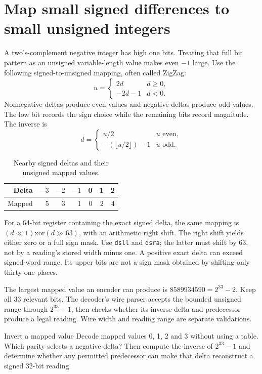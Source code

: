 \section{Map small signed differences to small unsigned integers}
A two's-complement negative integer has high one bits. Treating that full bit pattern
as an unsigned variable-length value makes even \(-1\) large. Use the following
signed-to-unsigned mapping, often called ZigZag:
\[
  u=\begin{cases}2d&d\geq0,\\-2d-1&d<0.\end{cases}
\]
Nonnegative deltas produce even values and negative deltas produce odd values.
The low bit records the sign choice while the remaining bits record magnitude.
The inverse is
\[
  d=\begin{cases}u/2&u\text{ even},\\-(\lfloor u/2\rfloor)-1&u\text{ odd}.\end{cases}
\]

\begin{table}[htbp]
  \centering
  \caption{Nearby signed deltas and their unsigned mapped values.}
  \begin{tabular}{rrrrrrr}
    \toprule
    Delta  & \(-3\) & \(-2\) & \(-1\) & 0 & 1 & 2 \\
    \midrule
    Mapped & 5      & 3      & 1      & 0 & 2 & 4 \\
    \bottomrule
  \end{tabular}
\end{table}

For a 64-bit register containing the exact signed delta, the same mapping is
\((d\ll1)\mathbin{\mathrm{xor}}(d\gg63)\), with an arithmetic right shift.
The right shift yields either zero or a full sign mask. Use \texttt{dsll} and
\texttt{dsra}; the latter must shift by 63, not by a reading's stored width minus
one. A positive exact delta can exceed signed-word range. Its upper bits are not a
sign mask obtained by shifting only thirty-one places.

The largest mapped value an encoder can produce is \(8589934590=2^{33}-2\).
Keep all 33 relevant bits. The decoder's wire parser accepts the bounded unsigned
range through \(2^{33}-1\), then checks whether its inverse delta and predecessor
produce a legal reading. Wire width and reading range are separate validations.

\begin{MARSExercise}{Invert a mapped value}
  Decode mapped values 0, 1, 2 and 3 without using a table. Which parity selects a
  negative delta? Then compute the inverse of \(2^{33}-1\) and determine whether any
  permitted predecessor can make that delta reconstruct a signed 32-bit reading.
\end{MARSExercise}
